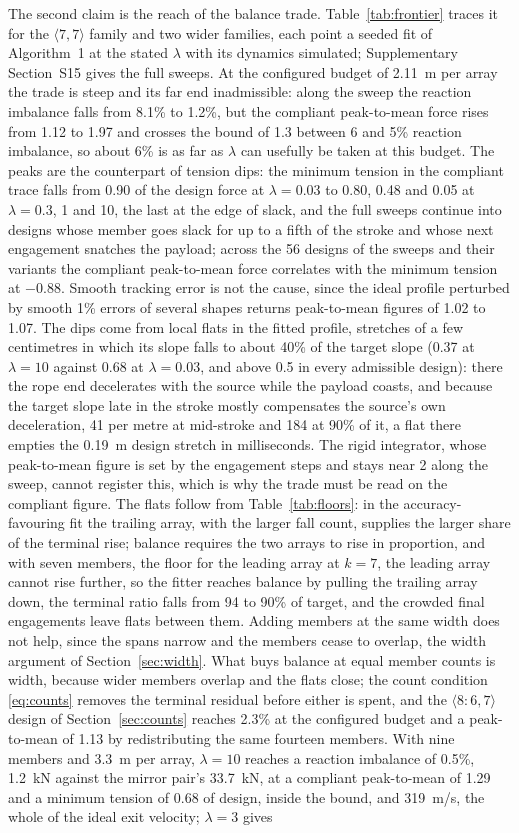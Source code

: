 \documentclass[preprint,12pt,number]{elsarticle}
\newcommand{\cfg}[2]{\langle #1,#2\rangle}
\newcommand{\ptm}{peak-to-mean}
\begin{document}
The second claim is the reach of the balance trade. Table~\ref{tab:frontier} traces it for the $\cfg{7}{7}$ family and two wider families, each point a seeded fit of Algorithm~1 at the stated $\lambda$ with its dynamics simulated; Supplementary Section~S15 gives the full sweeps. At the configured budget of 2.11~m per array the trade is steep and its far end inadmissible: along the sweep the reaction imbalance falls from 8.1\% to 1.2\%, but the compliant \ptm{} force rises from 1.12 to 1.97 and crosses the bound of 1.3 between 6 and 5\% reaction imbalance, so about 6\% is as far as $\lambda$ can usefully be taken at this budget. The peaks are the counterpart of tension dips: the minimum tension in the compliant trace falls from 0.90 of the design force at $\lambda = 0.03$ to 0.80, 0.48 and 0.05 at $\lambda = 0.3$, 1 and 10, the last at the edge of slack, and the full sweeps continue into designs whose member goes slack for up to a fifth of the stroke and whose next engagement snatches the payload; across the 56 designs of the sweeps and their variants the compliant \ptm{} force correlates with the minimum tension at $-0.88$. Smooth tracking error is not the cause, since the ideal profile perturbed by smooth 1\% errors of several shapes returns \ptm{} figures of 1.02 to 1.07. The dips come from local flats in the fitted profile, stretches of a few centimetres in which its slope falls to about 40\% of the target slope (0.37 at $\lambda = 10$ against 0.68 at $\lambda = 0.03$, and above 0.5 in every admissible design): there the rope end decelerates with the source while the payload coasts, and because the target slope late in the stroke mostly compensates the source's own deceleration, 41 per metre at mid-stroke and 184 at 90\% of it, a flat there empties the 0.19~m design stretch in milliseconds. The rigid integrator, whose \ptm{} figure is set by the engagement steps and stays near 2 along the sweep, cannot register this, which is why the trade must be read on the compliant figure. The flats follow from Table~\ref{tab:floors}: in the accuracy-favouring fit the trailing array, with the larger fall count, supplies the larger share of the terminal rise; balance requires the two arrays to rise in proportion, and with seven members, the floor for the leading array at $k=7$, the leading array cannot rise further, so the fitter reaches balance by pulling the trailing array down, the terminal ratio falls from 94 to 90\% of target, and the crowded final engagements leave flats between them. Adding members at the same width does not help, since the spans narrow and the members cease to overlap, the width argument of Section~\ref{sec:width}. What buys balance at equal member counts is width, because wider members overlap and the flats close; the count condition \eqref{eq:counts} removes the terminal residual before either is spent, and the $\cfg{8{:}6}{7}$ design of Section~\ref{sec:counts} reaches 2.3\% at the configured budget and a \ptm{} of 1.13 by redistributing the same fourteen members. With nine members and 3.3~m per array, $\lambda = 10$ reaches a reaction imbalance of 0.5\%, 1.2~kN against the mirror pair's 33.7~kN, at a compliant \ptm{} of 1.29 and a minimum tension of 0.68 of design, inside the bound, and 319~m/s, the whole of the ideal exit velocity; $\lambda = 3$ gives 
\end{document}
